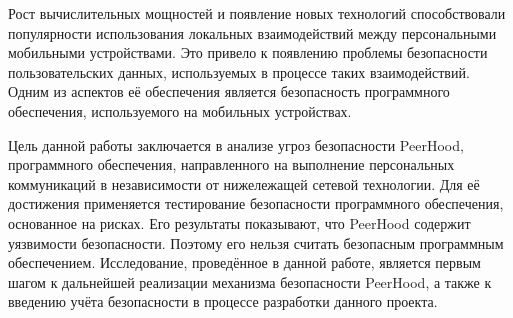 %
Рост вычислительных мощностей и появление новых технологий способствовали популярности использования локальных взаимодействий между персональными мобильными устройствами. 
%
Это привело к появлению проблемы безопасности пользовательских данных, используемых в процессе таких взаимодействий. 
%
Одним из аспектов её обеспечения является безопасность программного обеспечения, используемого на мобильных устройствах. 

%
Цель данной работы заключается в анализе угроз безопасности PeerHood, программного обеспечения, направленного на выполнение персональных коммуникаций в независимости от нижележащей сетевой технологии. 
%
Для её достижения применяется тестирование безопасности программного обеспечения, основанное на рисках. 
%
Его результаты показывают, что PeerHood содержит уязвимости безопасности.
%
Поэтому его нельзя считать безопасным программным обеспечением. 
%
Исследование, проведённое в данной работе, является первым шагом к дальнейшей реализации механизма безопасности PeerHood, а также к введению учёта безопасности в процессе разработки данного проекта.

